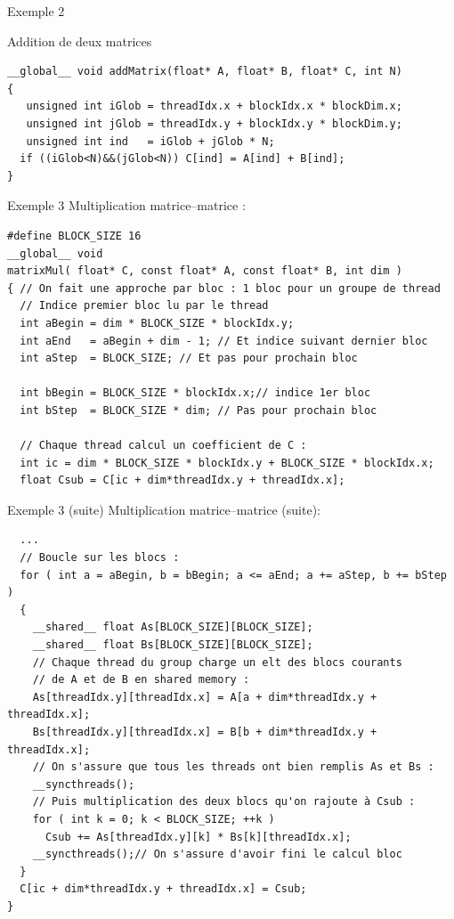 \documentclass[handout,francais]{beamer}
\begin{document}
\begin{frame}[containsverbatim]{Exemple 2}

\begin{block}{Addition de deux matrices}
\begin{lstlisting}
__global__ void addMatrix(float* A, float* B, float* C, int N) 
{
   unsigned int iGlob = threadIdx.x + blockIdx.x * blockDim.x;
   unsigned int jGlob = threadIdx.y + blockIdx.y * blockDim.y;
   unsigned int ind   = iGlob + jGlob * N;
  if ((iGlob<N)&&(jGlob<N)) C[ind] = A[ind] + B[ind];
}
\end{lstlisting}
\end{block}
\end{frame}

\begin{frame}[fragile]{Exemple 3}
 Multiplication matrice--matrice :
\begin{lstlisting}
#define BLOCK_SIZE 16
__global__ void
matrixMul( float* C, const float* A, const float* B, int dim )
{ // On fait une approche par bloc : 1 bloc pour un groupe de thread
  // Indice premier bloc lu par le thread
  int aBegin = dim * BLOCK_SIZE * blockIdx.y;
  int aEnd   = aBegin + dim - 1; // Et indice suivant dernier bloc
  int aStep  = BLOCK_SIZE; // Et pas pour prochain bloc
  
  int bBegin = BLOCK_SIZE * blockIdx.x;// indice 1er bloc
  int bStep  = BLOCK_SIZE * dim; // Pas pour prochain bloc
  
  // Chaque thread calcul un coefficient de C :
  int ic = dim * BLOCK_SIZE * blockIdx.y + BLOCK_SIZE * blockIdx.x;
  float Csub = C[ic + dim*threadIdx.y + threadIdx.x];
\end{lstlisting}
\end{frame}

\begin{frame}[fragile]{Exemple 3 (suite)}
 Multiplication matrice--matrice (suite):
\begin{lstlisting}
  ...
  // Boucle sur les blocs :
  for ( int a = aBegin, b = bBegin; a <= aEnd; a += aStep, b += bStep ) 
  {
    __shared__ float As[BLOCK_SIZE][BLOCK_SIZE];
    __shared__ float Bs[BLOCK_SIZE][BLOCK_SIZE];
    // Chaque thread du group charge un elt des blocs courants
    // de A et de B en shared memory :
    As[threadIdx.y][threadIdx.x] = A[a + dim*threadIdx.y + threadIdx.x];
    Bs[threadIdx.y][threadIdx.x] = B[b + dim*threadIdx.y + threadIdx.x];
    // On s'assure que tous les threads ont bien remplis As et Bs :
    __syncthreads();
    // Puis multiplication des deux blocs qu'on rajoute à Csub :
    for ( int k = 0; k < BLOCK_SIZE; ++k )
      Csub += As[threadIdx.y][k] * Bs[k][threadIdx.x];
    __syncthreads();// On s'assure d'avoir fini le calcul bloc
  }
  C[ic + dim*threadIdx.y + threadIdx.x] = Csub;
}
\end{lstlisting}
\end{frame}
\end{document}
